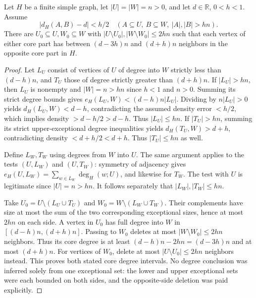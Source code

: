\begin{lemma}
Let $H$ be a finite simple graph, let $|U|=|W|=n>0$, and let
$d\in\mathbb R$, $0<h<1$. Assume
\[
|d_H(A,B)-d|<h/2\quad
(A\subseteq U,\ B\subseteq W,\ |A|,|B|>hn).
\]
There are $U_0\subseteq U,W_0\subseteq W$ with
$|U\setminus U_0|,|W\setminus W_0|\leq2hn$ such that each
vertex of either core part has between $(d-3h)n$ and $(d+h)n$
neighbors in the opposite core part in $H$.
\end{lemma}
\begin{proof}
Let $L_U$ consist of vertices of $U$ of degree into $W$ strictly
less than $(d-h)n$, and $T_U$ those of degree strictly greater
than $(d+h)n$. If $|L_U|>hn$, then $L_U$ is nonempty and
$|W|=n>hn$ since $h<1$ and $n>0$. Summing its strict degree
bounds gives
$e_H(L_U,W)<(d-h)n|L_U|$. Dividing by $n|L_U|>0$ yields
$d_H(L_U,W)<d-h$, contradicting the assumed density error
$<h/2$, which implies density $>d-h/2>d-h$.
Thus $|L_U|\leq hn$. If $|T_U|>hn$, summing its strict
upper-exceptional degree inequalities yields
$d_H(T_U,W)>d+h$, contradicting density $<d+h/2<d+h$.
Thus $|T_U|\leq hn$ as well.

Define $L_W,T_W$ using degrees from $W$ into $U$.
The same argument applies to the tests $(U,L_W)$ and $(U,T_W)$:
symmetry of adjacency gives
$e_H(U,L_W)=\sum_{w\in L_W}\deg_H(w;U)$, and likewise for
$T_W$. The test with $U$ is legitimate since $|U|=n>hn$.
It follows separately that $|L_W|,|T_W|\leq hn$.

Take $U_0=U\setminus(L_U\cup T_U)$ and
$W_0=W\setminus(L_W\cup T_W)$. Their complements have size
at most the sum of the two corresponding exceptional sizes,
hence at most $2hn$ on each side. A vertex in $U_0$ has full
degree into $W$ in $[(d-h)n,(d+h)n]$. Passing to $W_0$ deletes
at most $|W\setminus W_0|\leq2hn$ neighbors. Thus its core
degree is at least $(d-h)n-2hn=(d-3h)n$ and at most $(d+h)n$.
For vertices of $W_0$, delete at most $|U\setminus U_0|\leq2hn$
neighbors instead. This proves both stated core degree intervals.
No degree conclusion was inferred solely from one exceptional
set: the lower and upper exceptional sets were each bounded on
both sides, and the opposite-side deletion was paid explicitly.
\end{proof}
